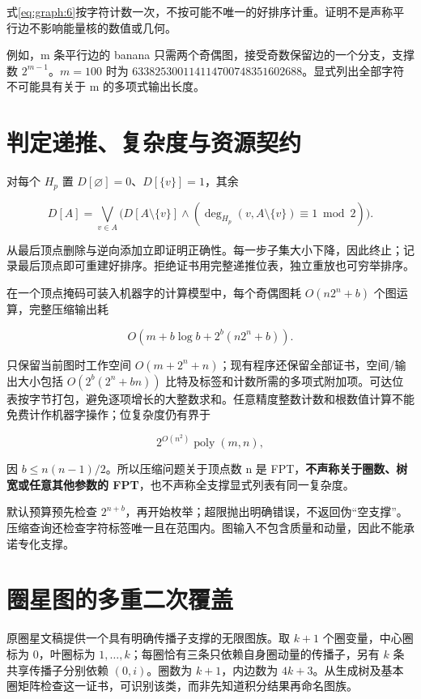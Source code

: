 \documentclass[11pt,a4paper,oneside]{ctexrep}
\theoremstyle{cnplain}
\theoremstyle{definition}
\theoremstyle{remark}
\begin{document}
式\eqref{eq:graph:6}按字符计数一次，不按可能不唯一的好排序计重。证明不是声称平行边不影响能量核的数值或几何。

例如，m 条平行边的 banana 只需两个奇偶图，接受奇数保留边的一个分支，支撑数 \(2^{m-1}\)。\(m=100\) 时为 \(633825300114114700748351602688\)。显式列出全部字符不可能具有关于 m 的多项式输出长度。

\section{判定递推、复杂度与资源契约}\label{sec:graph:4}

对每个 \(H_p\) 置 \(D[\varnothing]=0\)、\(D[\{v\}]=1\)，其余

\begin{equation}
D[A]=\bigvee_{v\in A}
   \bigl(D[A\setminus\{v\}]
     \land(\deg_{H_p}(v,A\setminus\{v\})\equiv1\bmod2)\bigr). \label{eq:graph:8}
\end{equation}

从最后顶点删除与逆向添加立即证明正确性。每一步子集大小下降，因此终止；记录最后顶点即可重建好排序。拒绝证书用完整递推位表，独立重放也可穷举排序。

在一个顶点掩码可装入机器字的计算模型中，每个奇偶图耗 \(O(n2^n+b)\) 个图运算，完整压缩输出耗

\begin{equation}
O(m+b\log b+2^b(n2^n+b)).
\end{equation}

只保留当前图时工作空间 \(O(m+2^n+n)\)；现有程序还保留全部证书，空间/输出大小包括 \(O(2^b(2^n+bn))\) 比特及标签和计数所需的多项式附加项。可达位表按字节打包，避免逐项增长的大整数求和。任意精度整数计数和根数值计算不能免费计作机器字操作；位复杂度仍有界于

\begin{equation}
2^{O(n^2)}\operatorname{poly}(m,n),
\end{equation}

因 \(b\le n(n-1)/2\)。所以压缩问题关于顶点数 n 是 FPT，\textbf{不声称关于圈数、树宽或任意其他参数的 FPT}，也不声称全支撑显式列表有同一复杂度。

默认预算预先检查 \(2^{n+b}\)，再开始枚举；超限抛出明确错误，不返回伪``空支撑''。压缩查询还检查字符标签唯一且在范围内。图输入不包含质量和动量，因此不能承诺专化支撑。


\section{圈星图的多重二次覆盖}
原圈星文稿提供一个具有明确传播子支撑的无限图族。取 $k+1$ 个圈变量，中心圈标为 $0$，叶圈标为 $1,\ldots,k$；每圈恰有三条只依赖自身圈动量的传播子，另有 $k$ 条共享传播子分别依赖 $(0,i)$。圈数为 $k+1$，内边数为 $4k+3$。从生成树及基本圈矩阵检查这一证书，可识别该类，而非先知道积分结果再命名图族。
\end{document}
